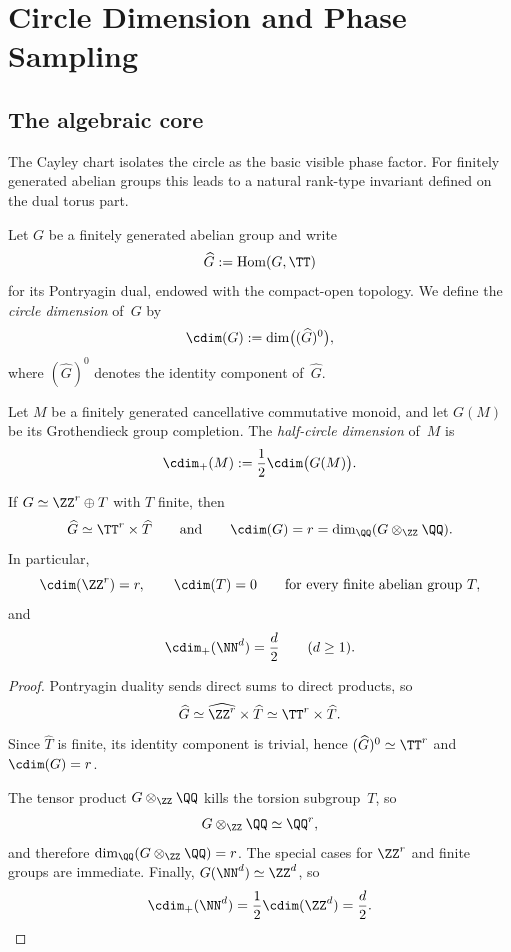 \section{Circle Dimension and Phase Sampling}\label{sec:circle-dimension}

\subsection{The algebraic core}

The Cayley chart isolates the circle as the basic visible phase factor.
For finitely generated abelian groups this leads to a natural rank-type
invariant defined on the dual torus part.

\begin{definition}\label{def:circle-dimension}
Let $G$ be a finitely generated abelian group and write
\[
\widehat G:=\operatorname{Hom}(G,\TT)
\]
for its Pontryagin dual, endowed with the compact-open topology.  We
define the \emph{circle dimension} of~$G$ by
\[
\cdim(G):=\dim\bigl((\widehat G)^0\bigr),
\]
where $(\widehat G)^0$ denotes the identity component of~$\widehat G$.
\end{definition}

\begin{definition}\label{def:half-circle-dimension}
Let $M$ be a finitely generated cancellative commutative monoid, and let
$G(M)$ be its Grothendieck group completion.  The \emph{half-circle
dimension} of~$M$ is
\[
\cdim_+(M):=\frac{1}{2}\cdim\bigl(G(M)\bigr).
\]
\end{definition}

\begin{proposition}\label{prop:circle-dimension-basic}
If $G\simeq \ZZ^r\oplus T$ with $T$ finite, then
\[
\widehat G\simeq \TT^r\times \widehat T
\qquad\text{and}\qquad
\cdim(G)=r=\dim_{\QQ}(G\otimes_{\ZZ}\QQ).
\]
In particular,
\[
\cdim(\ZZ^r)=r,
\qquad
\cdim(T)=0
\qquad\text{for every finite abelian group }T,
\]
and
\[
\cdim_+(\NN^d)=\frac{d}{2}
\qquad(d\ge 1).
\]
\end{proposition}

\begin{proof}
Pontryagin duality sends direct sums to direct products, so
\[
\widehat G\simeq \widehat{\ZZ^r}\times \widehat T \simeq \TT^r\times \widehat T.
\]
Since $\widehat T$ is finite, its identity component is trivial, hence
$(\widehat G)^0\simeq \TT^r$ and $\cdim(G)=r$.

The tensor product $G\otimes_{\ZZ}\QQ$ kills the torsion subgroup~$T$,
so
\[
G\otimes_{\ZZ}\QQ \simeq \QQ^r,
\]
and therefore $\dim_{\QQ}(G\otimes_{\ZZ}\QQ)=r$.  The special cases for
$\ZZ^r$ and finite groups are immediate.  Finally,
$G(\NN^d)\simeq \ZZ^d$, so
\[
\cdim_+(\NN^d)=\frac{1}{2}\cdim(\ZZ^d)=\frac{d}{2}.
\]
\end{proof}

